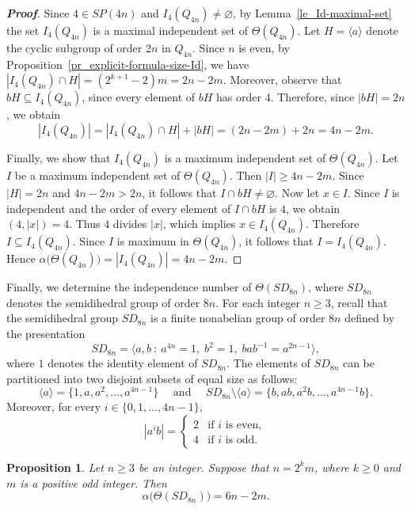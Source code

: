 \documentclass{amsart}
\theoremstyle{plain}
\newtheorem{proposition}[theorem]{Proposition}
\theoremstyle{definition}
\begin{document}
\begin{proof}[\textbf{Proof}]
Since $4\in SP(4n)$ and $I_4(Q_{4n})\neq \varnothing$,  by Lemma~\ref{le_Id-maximal-set} the set $I_4(Q_{4n})$ is a maximal independent set of $\Theta(Q_{4n})$. Let $H = \langle a \rangle $ denote the cyclic subgroup of order $2n$ in $Q_{4n}$. Since $n$ is even, by Proposition~\ref{pr_explicit-formula-size-Id}, we have $|I_4(Q_{4n})\cap H| = (2^{k+1}-2)m = 2n-2m$. Moreover, observe that $bH \subseteq I_4(Q_{4n})$, since every element of $bH$ has order $4$. Therefore, since $|bH| =2n$, we obtain
\[|I_4(Q_{4n})| = |I_4(Q_{4n})\cap H| + |bH|= (2n-2m)+2n= 4n-2m.\]

Finally, we show that $I_4(Q_{4n})$ is a maximum independent set of $\Theta(Q_{4n})$. Let $I$ be a maximum independent set of $\Theta(Q_{4n})$. Then $|I|\geq 4n-2m$. Since $|H|=2n$ and $4n-2m> 2n$, it follows that $I\cap bH \neq \varnothing$. Now let $x\in I$. Since $I$ is independent and the order of every element of $I\cap bH$ is $4$, we obtain $(4, |x|)= 4$. Thus $4$ divides $|x|$, which implies $x\in I_4(Q_{4n})$. Therefore $I\subseteq I_4(Q_{4n})$. Since $I$ is maximum in $\Theta(Q_{4n})$, it follows that $I=I_4(Q_{4n})$. Hence 
$\alpha\bigl(\Theta(Q_{4n})\bigr)= |I_4(Q_{4n})| = 4n-2m$.
\end{proof}	

	
Finally, we determine the independence number of $\Theta(SD_{8n})$, where $SD_{8n}$ denotes the semidihedral group of order $8n$. For each integer $n\geq 3$, recall that the semidihedral group $SD_{8n}$ is a finite nonabelian group of order $8n$ defined by the presentation
\[SD_{8n}=\bigl\langle a,b \ \colon \ a^{4n}=1,\; b^2=1,\; bab^{-1}=a^{2n-1} \bigr\rangle,\] where $1$ denotes the identity element of $SD_{8n}$. The elements of $SD_{8n}$ can be partitioned into two disjoint subsets of equal size as follows:
\[\langle a \rangle = \bigl\{1,a,a^2, \ldots, a^{4n-1}\bigr\} \quad \text{ and } \quad SD_{8n}\setminus \langle a \rangle = \bigl\{b,ab,a^2b, \ldots, a^{4n-1}b\bigr\}.\]
Moreover, for every $i\in \{0,1,\ldots, 4n-1\}$,
\begin{equation*}
	|a^ib| =
	\begin{cases}
		2 & \text{if $i$ is even},\\
		4 & \text{if $i$ is odd}.
	\end{cases}
\end{equation*}


\begin{proposition}
Let $n\geq 3$ be an integer. Suppose that $n = 2^{k} m$, where $k \geq 0$ and $m$ is a positive odd integer. Then \[\alpha\bigl(\Theta(SD_{8n})\bigr)=6n-2m.\] 
\end{proposition}
\end{document}
